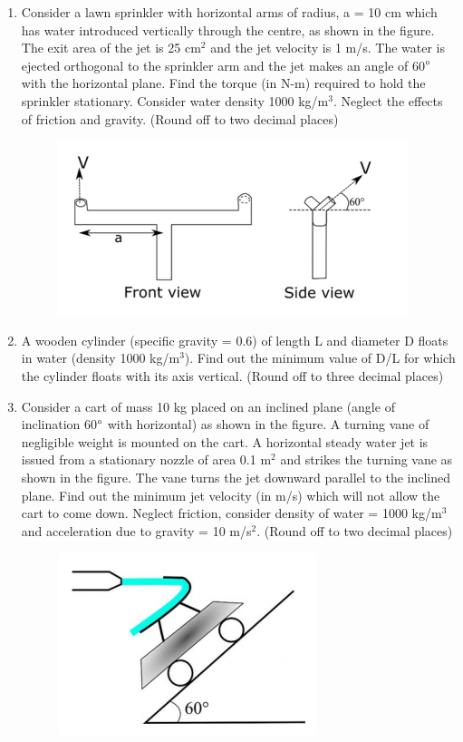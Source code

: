 \documentclass[a4paper,10pt]{article}
\begin{document}
\begin{enumerate}
\hfill{}

\item Consider a lawn sprinkler with horizontal arms of radius, a = 10 cm which has water introduced vertically through the centre, as shown in the figure. The exit area of the jet is 25 cm$^2$ and the jet velocity is 1 m/s. The water is ejected orthogonal to the sprinkler arm and the jet makes an angle of 60$\degree$ with the horizontal plane. Find the torque (in N-m) required to hold the sprinkler stationary. Consider water density 1000 kg/m$^3$. Neglect the effects of friction and gravity.
(Round off to two decimal places)
\begin{figure}[H]
    \centering
    \includegraphics[width=0.6\columnwidth]{q39.png}
    \caption*{}
    \label{fig:q39}
\end{figure}

\hfill{}

\item A wooden cylinder (specific gravity = 0.6) of length L and diameter D floats in water (density 1000 kg/m$^3$). Find out the minimum value of D/L for which the cylinder floats with its axis vertical.
(Round off to three decimal places)

\hfill{}

\item Consider a cart of mass 10 kg placed on an inclined plane (angle of inclination 60$\degree$ with horizontal) as shown in the figure. A turning vane of negligible weight is mounted on the cart. A horizontal steady water jet is issued from a stationary nozzle of area 0.1 m$^2$ and strikes the turning vane as shown in the figure. The vane turns the jet downward parallel to the inclined plane. Find out the minimum jet velocity (in m/s) which will not allow the cart to come down. Neglect friction, consider density of water = 1000 kg/m$^3$ and acceleration due to gravity = 10 m/s$^2$.
(Round off to two decimal places)
\begin{figure}[H]
    \centering
    \includegraphics[width=0.6\columnwidth]{q41.png}
    \caption*{}
    \label{fig:q41}
\end{figure}


\end{enumerate}
\end{document}
